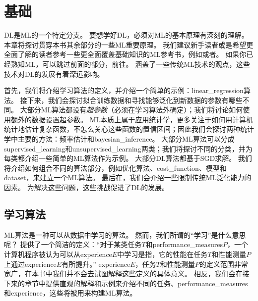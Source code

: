 \chapter{基础}
\label{chap:machine_learning_basics}
\gls{DL}是\gls{ML}的一个特定分支。
要想学好\gls{DL}，必须对\gls{ML}的基本原理有深刻的理解。
本章将探讨贯穿本书其余部分的一些\gls{ML}重要原理。
我们建议新手读者或是希望更全面了解的读者参考一些更全面覆盖基础知识的\gls{ML}参考书，例如\cite{MurphyBook2012}或者\cite{bishop-book2006}。
如果你已经熟知\gls{ML}，可以跳过前面的部分，前往。
涵盖了一些传统\gls{ML}技术的观点，这些技术对\gls{DL}的发展有着深远影响。

首先，我们将介绍学习算法的定义，并介绍一个简单的示例：\gls{linear_regression}算法。
接下来，我们会探讨拟合训练数据和寻找能够泛化到新数据的参数有哪些不同。
大部分\gls{ML}算法都设有\emph{超参数}（必须在学习算法外确定）；我们将讨论如何使用额外的数据设置超参数。
\gls{ML}本质上属于应用统计学，更多关注于如何用计算机统计地估计复杂函数，不怎么关心这些函数的置信区间；因此我们会探讨两种统计学中主要的方法：频率估计和\gls{bayesian_inference}。
大部分\gls{ML}算法可以分成\gls{supervised_learning}和\gls{unsupervised_learning}两类；我们将探讨不同的分类，并为每类都介绍一些简单的\gls{ML}算法作为示例。
大部分\gls{DL}算法都基于\gls{SGD}求解。
我们将介绍如何组合不同的算法部分，例如优化算法、\gls{cost_function}、模型和\gls{dataset}，来建立一个\gls{ML}算法。
最后在，我们会介绍一些限制传统\gls{ML}泛化能力的因素。
为解决这些问题，这些挑战促进了\gls{DL}的发展。


\section{学习算法}
\label{sec:learning_algorithms}
\gls{ML}算法是一种可以从数据中学习的算法。
然而，我们所谓的``学习''是什么意思呢？
\cite{Mitchell:1997:ML}提供了一个简洁的定义：``对于某类任务$T$和\gls{performance_measures}$P$，一个计算机程序被认为可以从\gls{experience}$E$中学习是指，它的性能在任务$T$和性能测量$P$上通过\gls{experience}$E$有所提升。''
\gls{experience}$E$，任务$T$和性能测量$P$的定义范围非常宽广，在本书中我们并不会去试图解释这些定义的具体意义。
相反，我们会在接下来的章节中提供直观的解释和示例来介绍不同的任务、\gls{performance_measures}和\gls{experience}，这些将被用来构建\gls{ML}算法。

